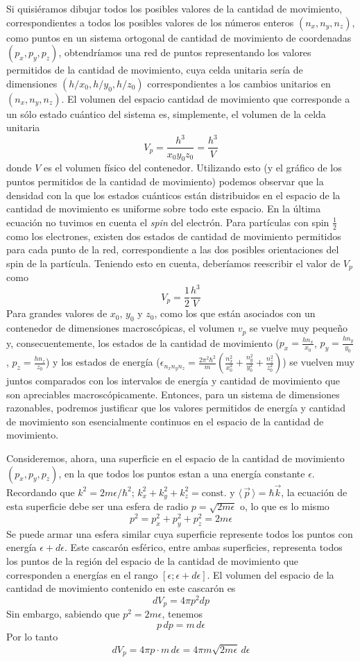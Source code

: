 \documentclass[12pt,a4paper]{article}
\def\e{{\epsilon}} %
\begin{document}
Si quisiéramos dibujar todos los posibles valores de la cantidad de movimiento, correspondientes a todos los posibles valores de los números enteros $(n_{x},n_{y},n_{z})$, como puntos en un sistema ortogonal de cantidad de movimiento de coordenadas $(p_{x},p_{y},p_{z})$, obtendríamos una red de puntos representando los valores permitidos de la cantidad de movimiento, cuya celda unitaria sería de dimensiones $(h/x_{0},h/y_{0},h/z_{0})$ correspondientes a los cambios unitarios en $(n_{x},n_{y},n_{z})$. El volumen del espacio cantidad de movimiento que corresponde a un sólo estado cuántico del sistema es, simplemente, el volumen de la celda unitaria
\[ V_{p}=\frac{h^{3}}{x_{0}y_{0}z_{0}}=\frac{h^{3}}{V} \]
donde $V$ es el volumen físico del contenedor. Utilizando esto (y el gráfico de los puntos permitidos de la cantidad de movimiento) podemos observar que la densidad con la que los estados cuánticos están distribuidos en el espacio de la cantidad de movimiento es uniforme sobre todo este espacio. En la última ecuación no tuvimos en cuenta el \emph{spin} del electrón. Para partículas con spin $\frac{1}{2}$ como los electrones, existen dos estados de cantidad de movimiento permitidos para cada punto de la red, correspondiente a las dos posibles orientaciones del spin de la partícula. Teniendo esto en cuenta, deberíamos reescribir el valor de $V_{p}$ como
\[ V_{p}=\frac{1}{2} \frac{h^{3}}{V} \]
Para grandes valores de $x_{0}$, $y_{0}$ y $z_{0}$, como los que están asociados con un contenedor de dimensiones macroscópicas, el volumen $v_{p}$ se vuelve muy pequeño y, consecuentemente, los estados de la cantidad de movimiento ($p_{x}=\frac{hn_{x}}{x_{0}}$, $p_{y}=\frac{hn_{y}}{y_{0}}$, $p_{z}=\frac{hn_{z}}{z_{0}}$) y los estados de energía ($\e_{n_{x}n_{y}n_{z}}=\frac{2 \pi ^{2} \hbar^{2}}{m} ( \frac{n_{x}^{2}}{x_{0}^{2}} + \frac{n_{y}^{2}}{y_{0}^{2}} + \frac{n_{z}^{2}}{z_{0}^{2}})$) se vuelven muy juntos comparados con los intervalos de energía y cantidad de movimiento que son apreciables macroscópicamente. Entonces, para un sistema de dimensiones razonables, podremos justificar que los valores permitidos de energía y cantidad de movimiento son esencialmente continuos en el espacio de la cantidad de movimiento.

Consideremos, ahora, una superficie en el espacio de la cantidad de movimiento $(p_{x},p_{y},p_{z})$, en la que todos los puntos estan a una energía constante $\e$. Recordando que $k^{2}=2m\e/\hbar^{2}$; $k_{x}^{2}+k_{y}^{2}+k_{z}^{2}=\textrm{const.}$ y $\langle \, \vec{p} \, \rangle=\hbar \vec{k}$, la ecuación de esta superficie debe ser una esfera de radio $p=\sqrt{2m\e}$ o, lo que es lo mismo
\[ p^{2}=p_{x}^{2}+p_{y}^{2}+p_{z}^{2}=2m\e \]
Se puede armar una esfera similar cuya superficie represente todos los puntos con energía $\e+d\e$. Este cascarón esférico, entre ambas superficies, representa todos los puntos de la región del espacio de la cantidad de movimiento que corresponden a energías en el rango $[\e;\e+d\e]$. El volumen del espacio de la cantidad de movimiento contenido en este cascarón es
\[ dV_{p}=4\pi p^{2} dp \]
Sin embargo, sabiendo que $p^{2}=2m\e$, tenemos
\[ p \, dp=m \, d\e \]
Por lo tanto
\[ dV_{p}=4\pi p \cdot m \, d\e=4 \pi m \sqrt{2m\e} \, d\e \]
\end{document}
